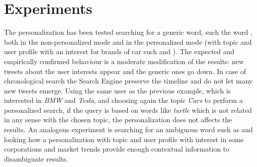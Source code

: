 \section{Experiments}

The personalization has been tested searching for a generic word, such the word , both in the non-personalized mode and in the personalized mode (with topic  and user profile with an interest for brands of car such  and ).
The expected and empirically confirmed behaviour is a moderate modification of the results: new tweets about the user interests appear and the generic ones go down.
In case of chronological search the Search Engine preserve the timeline and do not let many new tweets emerge.
Using the same user as the previous example, which is interested in \textit{BMW} and \textit{Tesla}, and choosing again the topic \textit{Cars} to perform a personalized search, if the query is based on words like \textit{turtle} which is not related in any sense with the chosen topic, the personalization does not affects the results.
An analogous experiment is searching for an ambiguous word such as  and looking how a personalization with topic  and user profile with interest in some corporations and market trends provide enough contextual information to disambiguate results. 
